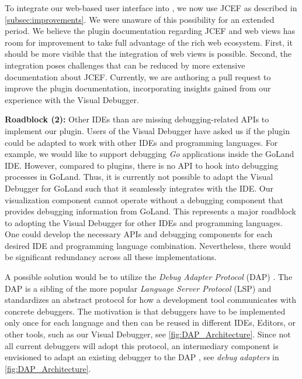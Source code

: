 \documentclass[sigconf]{acmart}
\begin{document}
To integrate our web-based user interface into \intellij{}, we now use JCEF as described in \autoref{subsec:improvements}.
We were unaware of this possibility for an extended period.
We believe the plugin documentation regarding JCEF and web views has room for improvement to take full advantage of the rich web ecosystem.
First, it should be more visible that the integration of web views is possible.
Second, the integration poses challenges that can be reduced by more extensive documentation about JCEF.
Currently, we are authoring a pull request to improve the plugin documentation, incorporating insights gained from our experience with the Visual Debugger. %

\textbf{Roadblock (2):} Other IDEs than \intellij{} are missing debugging-related APIs to implement our plugin.
Users of the Visual Debugger have asked us if the plugin could be adapted to work with other IDEs and programming languages.
For example, we would like to support debugging \textit{Go} applications inside the GoLand IDE.
However, compared to \intellij{} plugins, there is no API to hook into debugging processes in GoLand.
Thus, it is currently not possible to adapt the Visual Debugger for GoLand such that it seamlessly integrates with the IDE.
Our visualization component cannot operate without a debugging component that provides debugging information from GoLand.
This represents a major roadblock to adopting the Visual Debugger for other IDEs and programming languages.
One could develop the necessary APIs and debugging components for each desired IDE and programming language combination.
Nevertheless, there would be significant redundancy across all these implementations.

A possible solution would be to utilize the \textit{Debug Adapter Protocol} (DAP) \cite{microsoftDebugAdapterProtocol2023}.
The DAP is a sibling of the more popular \textit{Language Server Protocol} (LSP) \cite{microsoftLanguageServerProtocol2023} and standardizes an abstract protocol for how a development tool communicates with concrete debuggers.
The motivation is that debuggers have to be implemented only once for each language and then can be reused in different IDEs, Editors, or other tools, such as our Visual Debugger, see \autoref{fig:DAP_Architecture}.
Since not all current debuggers will adopt this protocol, an intermediary component is envisioned to adapt an existing debugger to the DAP \cite{microsoftDebugAdapterProtocol2023}, see \textit{debug adapters} in \autoref{fig:DAP_Architecture}.
\end{document}

